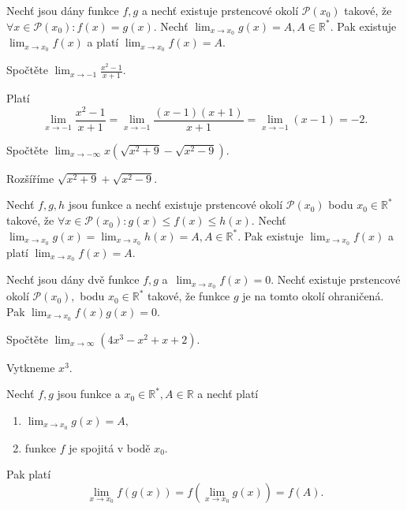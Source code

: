 \begin{veta}
Nechť jsou dány funkce $f,g$ a nechť existuje prstencové okolí
$\mathscr P(x_0)$ takové, že $\forall x \in \mathscr P(x_0):f(x)=g(x).$
Nechť $\lim_{x\to x_0}g(x)=A, A\in \mathbb R^*.$ Pak existuje $\lim_{x\to x_0}f(x)$
a platí $\lim_{x\to x_0}f(x)=A.$
\end{veta}

\begin{priklad}
Spočtěte $\lim_{x\to -1}\frac{x^2-1}{x+1}$.
\end{priklad}

\begin{reseni}
 Platí
 $$\lim_{x\to -1}\frac{x^2-1}{x+1}=\lim_{x\to -1}\frac{(x-1)(x+1)}{x+1}=\lim_{x\to -1}(x-1)=-2.$$
\end{reseni}

\begin{priklad}
Spočtěte $\lim_{x\to-\infty}x(\sqrt{x^2+9}-\sqrt{x^2-9})$.
\end{priklad}

\begin{reseni}
Rozšíříme $\sqrt{x^2+9}+\sqrt{x^2-9}.  $
\end{reseni}

\begin{veta}
Nechť $f,g,h$ jsou funkce a nechť existuje prstencové okolí $\mathscr P(x_0)$
bodu $x_0\in \mathbb R^*$ takové, že $\forall x \in \mathscr P(x_0):g(x)\leq f(x)\leq h(x).$
Nechť $\lim_{x\to x_0}g(x)=\lim_{x\to x_0}h(x)=A, A \in \mathbb R^*.$ Pak existuje
$\lim_{x\to x_0}f(x)$ a  platí $ \lim_{x\to x_0}f(x) = A.$
\end{veta}

\begin{veta}
Nechť jsou dány dvě funkce $f,g$ a~$\lim_{x\to x_0}f(x)=0.$ Nechť existuje prstencové
okolí $\mathscr P(x_0),$ bodu $x_0\in \mathbb R^*$ takové, že
funkce $g$ je na tomto okolí ohraničená. Pak $\lim_{x\to x_0}f(x)g(x)=0.$
\end{veta}

\begin{priklad}
Spočtěte $\lim_{x\to \infty}\left ( 4x^3-x^2+x+2 \right ) .$
\end{priklad}

\begin{reseni}
Vytkneme $x^3$.
\end{reseni}

\begin{veta}\label{slozf}
Nechť $f,g$ jsou funkce a $x_0\in \mathbb R^*, A \in \mathbb R$ a nechť platí
\begin{enumerate}[$i.$]
\item $\lim_{x\to x_0}g(x)=A,$
\item funkce $f$ je spojitá v bodě $x_0.$
\end{enumerate}
Pak platí
$$\lim_{x\to x_0}f \left ( g(x) \right ) =f \left ( \lim_{x\to x_0}g(x) \right ) =f(A).$$
\end{veta}



